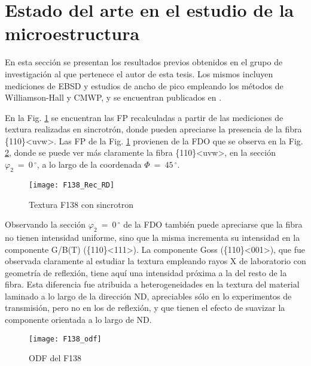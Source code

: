 \section{Estado del arte en el estudio de la microestructura}\label{S:F138Nati}
En esta sección se presentan los resultados previos obtenidos en el grupo de investigación al que pertenece el autor de esta tesis. Los mismos incluyen mediciones de EBSD y estudios de ancho de pico empleando los métodos de Williamson-Hall y CMWP, y se encuentran publicados en \cite{Devincentis2015PhD,Devincentis2017}.

En la Fig. \ref{fig:F138PF} se encuentran las FP recalculadas a partir de las mediciones de textura realizadas en sincrotrón, donde pueden apreciarse la presencia de la fibra \{110\}\textless uvw\textgreater. 
Las FP de la Fig. \ref{fig:F138PF} provienen de la FDO que se observa en la Fig. \ref{fig:F138ODF}, donde se puede ver más claramente la fibra \{110\}\textless uvw\textgreater, en la sección $\varphi_2 \ = \ 0$\,$^{\circ}$, a lo largo de la coordenada $\Phi \ = \ 45$\,$^{\circ}$.

\begin{figure}[!htb]
  \centering
  \texttt{[image: F138\_Rec\_RD]}
  \caption{Textura F138 con sincrotron}
  \label{fig:F138PF}
\end{figure}

Observando la sección $\varphi_2 \ = \ 0$\,$^{\circ}$ de la FDO también puede apreciarse que la fibra no tienen intensidad uniforme, sino que la misma incrementa su intensidad en la componente  G/B(T) (\{110\}\textless 111\textgreater). 
La componente Goss (\{110\}\textless 001\textgreater), que fue observada claramente al estudiar la textura empleando rayos X de laboratorio con geometría de reflexión, tiene aquí una intensidad próxima a la del resto de la fibra.
Esta diferencia fue atribuida a heterogeneidades en la textura del material laminado a lo largo de la dirección ND, apreciables sólo en lo experimentos de transmisión, pero no en los de reflexión, y que tienen el efecto de suavizar la componente orientada a lo largo de ND.

\begin{figure}[!htb]
  \centering
  \texttt{[image: F138\_odf]}
  \caption{ODF del F138}
  \label{fig:F138ODF}
\end{figure}


